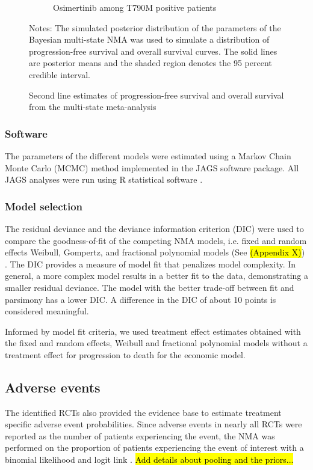 \documentclass[11pt,final,fleqn]{article}\usepackage[]{graphicx}\usepackage[]{color}
\theoremstyle{plain}
\newcommand\R{{\textsf{R}}}
\begin{document}
{\begin{figure}
\begin{subfigure}{\textwidth}
\caption{Osimertinib among T790M positive patients} \label{subfig:surv-2L_t790m-osi}
\end{subfigure}
\caption{Second line estimates of progression-free survival and overall survival from the multi-state meta-analysis}\label{fig:surv-2L}
\begin{minipage}{\linewidth}
\footnotesize
Notes: The simulated posterior distribution of the parameters of the Bayesian multi-state NMA was used to simulate a distribution of progression-free survival and overall survival curves. The solid lines are posterior means and the shaded region denotes the 95 percent credible interval.
\end{minipage}
\end{figure}

\subsubsection{Software}
The parameters of the different models were estimated using a Markov Chain Monte Carlo (MCMC) method implemented in the JAGS software package. All JAGS analyses were run using \R{} statistical software \citep{team2014r}.

\subsubsection{Model selection}
The residual deviance and the deviance information criterion (DIC) were used to compare the goodness-of-fit of the competing NMA models, i.e. fixed and random effects Weibull, Gompertz, and fractional polynomial models (See \hl{(Appendix X)}) \citep{dias2018network}. The DIC provides a measure of model fit that penalizes model complexity. In general, a more complex model results in a better fit to the data, demonstrating a smaller residual deviance. The model with the better trade-off between fit and parsimony has a lower DIC. A difference in the DIC of about 10 points is considered meaningful. 

Informed by model fit criteria, we used treatment effect estimates obtained with the fixed and random effects, Weibull and fractional polynomial models without a treatment effect for progression to death for the economic model. 


\subsection{Adverse events}\label{subsec:data-aes}
The identified RCTs also provided the evidence base to estimate treatment specific adverse event probabilities. Since adverse events in nearly all RCTs were reported as the number of patients experiencing the event, the NMA was performed on the proportion of patients experiencing the event of interest with a binomial likelihood and logit link \citep[Chapter~2]{dias2018network}. \hl{Add details about pooling and the priors...}

}
\end{document}

